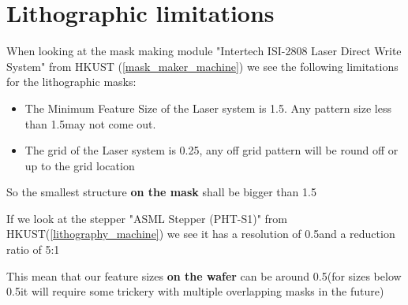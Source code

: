 \section{Lithographic limitations}\label{design_rules_lithographic}
When looking at the mask making module "Intertech ISI-2808 Laser Direct Write System" from HKUST (\autoref{mask_maker_machine}) we see the following limitations for the lithographic masks:
\begin{itemize}
	\item The Minimum Feature Size of the Laser system is 1.5\um. Any pattern size less than 1.5\um may not come out.
	\item The grid of the Laser system is 0.25\um, any off grid pattern will be round off or up to the grid location
\end{itemize}

So the smallest structure \textbf{on the mask} shall be bigger than 1.5\um

If we look at the stepper "ASML Stepper (PHT-S1)" from HKUST(\autoref{lithography_machine}) we see it has a resolution of 0.5\um and a reduction ratio of 5:1

This mean that our feature sizes \textbf{on the wafer} can be around 0.5\um (for sizes below 0.5\um it will require some trickery with multiple overlapping masks in the future)